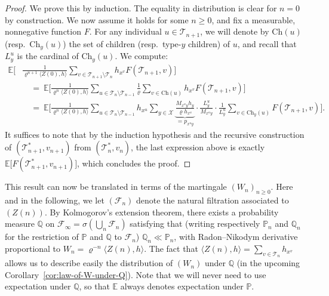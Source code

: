 \begin{refsegment}
\begin{proof}
  We prove this by induction.
  The equality in distribution is clear for $n=0$ by construction.
  We now assume it holds for some $n\geq 0$, and fix a measurable, nonnegative function $F$.
  For any individual $u\in \mathcal{T}_{n+1}$, we will denote by $\mathrm{Ch}(u)$ (resp.\ $\mathrm{Ch}_y(u)$) the set of children (resp.\ type-$y$ children) of $u$, and recall that $L^u_y$ is the cardinal of $\mathrm{Ch}_y(u)$.
  We compute:
  \begin{align*}
     \mathbb{E}\bigg[&\frac{1}{\varrho^{n+1} \langle Z(0), h\rangle}\sum_{v\in \mathcal{T}_{n+1}\setminus\mathcal{T}_n} h_{x^v}F(\mathcal{T}_{ n+1},v)\bigg]\\
     &\quad =\ \mathbb{E}\bigg[\frac{1}{\varrho^{n} \langle Z(0), h\rangle}\sum_{u\in \mathcal{T}_{n}\setminus \mathcal{T}_{n-1}} \frac{1}{\varrho} \sum_{v\in \mathrm{Ch}(u)} h_{x^v}F(\mathcal{T}_{ n+1},v)\bigg]\\
    &\quad =\ \mathbb{E}\bigg[\frac{1}{\varrho^{n}\langle Z(0), h\rangle}\sum_{u\in \mathcal{T}_{n}\setminus \mathcal{T}_{n-1}} h_{x^u} \sum_{y\in \mathcal{X}} \underbrace{ \frac{M_{x^uy}h_y}{\varrho h_{x^u}} }_{=p_{x^uy}} \cdot \frac{L^u_y}{M_{x^uy}} \cdot \frac{1}{L^u_y} \sum_{v\in \mathrm{Ch}_y(u)} F(\mathcal{T}_{ n+1},v)\bigg].
  \end{align*}
  It suffices to note that by the induction hypothesis and the recursive construction of $(\mathcal{T}^*_{ n+1},v_{n+1})$ from $(\mathcal{T}^*_{ n},v_{n})$, the last expression above is exactly $\mathbb{E}\big[F(\mathcal{T}^*_{ n+1}, v_{n+1})\big]$, which concludes the proof.
\end{proof}

This result can now be translated in terms of the martingale $(W_n)_{n\geq 0}$.
Here and in the following, we let $(\mathcal{F}_n)$ denote the natural filtration associated to $(Z(n))$.
By Kolmogorov's extension theorem, there exists a probability measure $\mathbb{Q}$ on $\mathcal{F}_\infty = \sigma(\bigcup_n \mathcal{F}_n)$ satisfying that (writing respectively $\mathbb{P}_n$ and $\mathbb{Q}_n$ for the restriction of $\mathbb{P}$ and $\mathbb{Q}$ to $\mathcal{F}_n$) $\mathbb{Q}_n \ll \mathbb{P}_n$, with Radon--Nikodym derivative proportional to $W_n=\varrho^{-n}\langle Z(n), h\rangle$.
The fact that $\langle Z(n), h\rangle=\sum_{v\in \mathcal{T}_n} h_{x^v}$ allows us to describe easily the distribution of $(W_n)$ under $\mathbb{Q}$ (in the upcoming Corollary~\ref{cor:law-of-W-under-Q}).
Note that we will never need to use expectation under $\mathbb{Q}$, so that $\mathbb{E}$ always denotes expectation under $\mathbb{P}$.


\end{refsegment}
